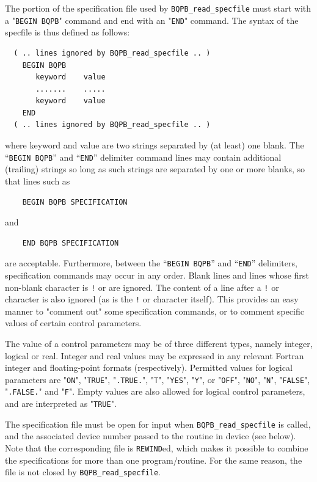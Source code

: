 \documentclass{galahad}
\newcommand{\packagename}{BQPB}
\begin{document}
The portion of the specification file used by
{\tt \packagename\_read\_specfile}
must start
with a "{\tt BEGIN \packagename}" command and end with an
"{\tt END}" command.  The syntax of the specfile is thus defined as follows:
\begin{verbatim}
  ( .. lines ignored by BQPB_read_specfile .. )
    BEGIN BQPB
       keyword    value
       .......    .....
       keyword    value
    END
  ( .. lines ignored by BQPB_read_specfile .. )
\end{verbatim}
where keyword and value are two strings separated by (at least) one blank.
The ``{\tt BEGIN \packagename}'' and ``{\tt END}'' delimiter command lines
may contain additional (trailing) strings so long as such strings are
separated by one or more blanks, so that lines such as
\begin{verbatim}
    BEGIN BQPB SPECIFICATION
\end{verbatim}
and
\begin{verbatim}
    END BQPB SPECIFICATION
\end{verbatim}
are acceptable. Furthermore,
between the
``{\tt BEGIN \packagename}'' and ``{\tt END}'' delimiters,
specification commands may occur in any order.  Blank lines and
lines whose first non-blank character is {\tt !} or {\tt *} are ignored.
The content
of a line after a {\tt !} or {\tt *} character is also
ignored (as is the {\tt !} or {\tt *}
character itself). This provides an easy manner to "comment out" some
specification commands, or to comment specific values
of certain control parameters.

The value of a control parameters may be of three different types, namely
integer, logical or real.
Integer and real values may be expressed in any relevant Fortran integer and
floating-point formats (respectively). Permitted values for logical
parameters are "{\tt ON}", "{\tt TRUE}", "{\tt .TRUE.}", "{\tt T}",
"{\tt YES}", "{\tt Y}", or "{\tt OFF}", "{\tt NO}",
"{\tt N}", "{\tt FALSE}", "{\tt .FALSE.}" and "{\tt F}".
Empty values are also allowed for
logical control parameters, and are interpreted as "{\tt TRUE}".

The specification file must be open for
input when {\tt \packagename\_read\_specfile}
is called, and the associated device number
passed to the routine in device (see below).
Note that the corresponding
file is {\tt REWIND}ed, which makes it possible to combine the specifications
for more than one program/routine.  For the same reason, the file is not
closed by {\tt \packagename\_read\_specfile}.
\end{document}
